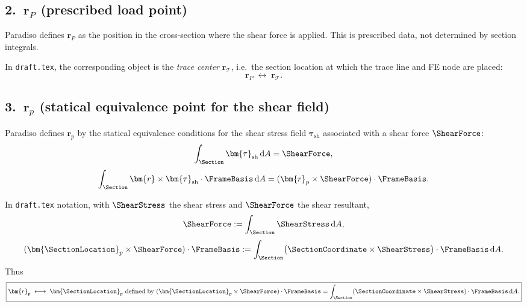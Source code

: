 \subsection*{2.\ $\bm{r}_P$ (prescribed load point)}

Paradiso defines $\bm{r}_P$ as the position in the cross-section where the shear force is applied. This is prescribed data, not determined by section integrals.

In \texttt{draft.tex}, the corresponding object is the \emph{trace center} $\bm{r}_{\mathcal T}$, i.e.\ the section location at which the trace line and FE node are placed:
\begin{equation}
  \boxed{\bm{r}_P \;\longleftrightarrow\; \bm{r}_{\mathcal T}.}
\end{equation}

\subsection*{3.\ $\bm{r}_p$ (statical equivalence point for the shear field)}

Paradiso defines $\bm{r}_p$ by the statical equivalence conditions for the shear stress field $\bm{\tau}_{\mathrm{sh}}$ associated with a shear force $\ShearForce$:
\begin{equation}
  \int_\Section \bm{\tau}_{\mathrm{sh}}\,\mathrm{d}A = \ShearForce,
\end{equation}
\begin{equation}
  \int_\Section \bm{r}\times\bm{\tau}_{\mathrm{sh}}\cdot\FrameBasis\,\mathrm{d}A
  = (\bm{r}_p\times\ShearForce)\cdot\FrameBasis.
\end{equation}

In \texttt{draft.tex} notation, with $\ShearStress$ the shear stress and $\ShearForce$ the shear resultant,
\begin{equation}
  \ShearForce := \int_\Section \ShearStress\,\mathrm{d}A,
\end{equation}
\begin{equation}
  (\bm{\SectionLocation}_p\times\ShearForce)\cdot\FrameBasis
  := \int_\Section \bigl(\SectionCoordinate\times\ShearStress\bigr)\cdot\FrameBasis\,\mathrm{d}A.
\end{equation}
Thus
\begin{equation}
  \boxed{\bm{r}_p \;\longleftrightarrow\; \bm{\SectionLocation}_p
  \text{ defined by }
  (\bm{\SectionLocation}_p\times\ShearForce)\cdot\FrameBasis
  = \int_\Section (\SectionCoordinate\times\ShearStress)\cdot\FrameBasis\,\mathrm{d}A.}
\end{equation}

